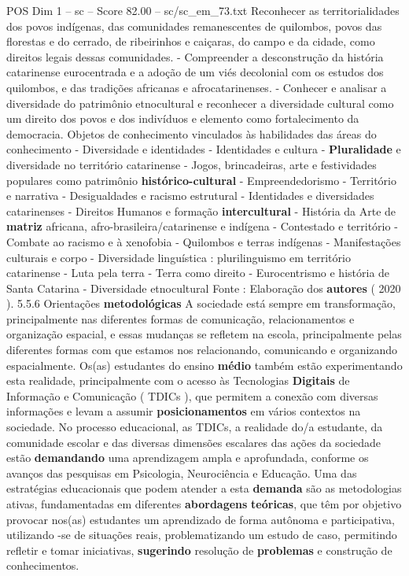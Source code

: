 \begin{textsample}{POS Dim 1 – sc – Score 82.00 – sc/sc\_em\_73.txt}
Reconhecer as territorialidades dos povos indígenas, das comunidades remanescentes de quilombos, povos das florestas e do cerrado, de ribeirinhos e caiçaras, do campo e da cidade, como direitos legais dessas comunidades. - Compreender a desconstrução da história catarinense eurocentrada e a adoção de um viés decolonial com os estudos dos quilombos, e das tradições africanas e afrocatarinenses. - Conhecer e analisar a diversidade do patrimônio etnocultural e reconhecer a diversidade cultural como um direito dos povos e dos indivíduos e elemento como fortalecimento da democracia.
Objetos de conhecimento vinculados às habilidades das áreas do conhecimento - Diversidade e identidades - Identidades e cultura - \textbf{Pluralidade} e diversidade no território catarinense - Jogos, brincadeiras, arte e festividades populares como patrimônio \textbf{histórico-cultural} - Empreendedorismo - Território e narrativa - Desigualdades e racismo estrutural - Identidades e diversidades catarinenses - Direitos Humanos e formação \textbf{intercultural} - História da Arte de \textbf{matriz} africana, afro-brasileira/catarinense e indígena - Contestado e território - Combate ao racismo e à xenofobia - Quilombos e terras indígenas - Manifestações culturais e corpo - Diversidade linguística : plurilinguismo em território catarinense - Luta pela terra - Terra como direito - Eurocentrismo e história de Santa Catarina - Diversidade etnocultural Fonte : Elaboração dos \textbf{autores} ( 2020 ). 5.5.6 Orientações \textbf{metodológicas} A sociedade está sempre em transformação, principalmente nas diferentes formas de comunicação, relacionamentos e organização espacial, e essas mudanças se refletem na escola, principalmente pelas diferentes formas com que estamos nos relacionando, comunicando e organizando espacialmente.
Os(as) estudantes do ensino \textbf{médio} também estão experimentando esta realidade, principalmente com o acesso às Tecnologias \textbf{Digitais} de Informação e Comunicação ( TDICs ), que permitem a conexão com diversas informações e levam a assumir \textbf{posicionamentos} em vários contextos na sociedade.
No processo educacional, as TDICs, a realidade do/a estudante, da comunidade escolar e das diversas dimensões escalares das ações da sociedade estão \textbf{demandando} uma aprendizagem ampla e aprofundada, conforme os avanços das pesquisas em Psicologia, Neurociência e Educação.
Uma das estratégias educacionais que podem atender a esta \textbf{demanda} são as metodologias ativas, fundamentadas em diferentes \textbf{abordagens} \textbf{teóricas}, que têm por objetivo provocar nos(as) estudantes um aprendizado de forma autônoma e participativa, utilizando -se de situações reais, problematizando um estudo de caso, permitindo refletir e tomar iniciativas, \textbf{sugerindo} resolução de \textbf{problemas} e construção de conhecimentos.

\end{textsample}
